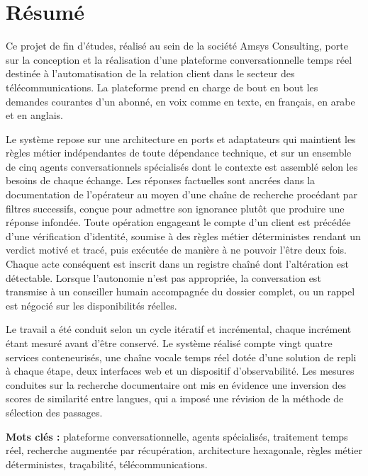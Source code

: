 \chapter*{Résumé}
\thispagestyle{empty}

Ce projet de fin d'études, réalisé au sein de la société Amsys Consulting, porte sur la conception et la réalisation d'une plateforme conversationnelle temps réel destinée à l'automatisation de la relation client dans le secteur des télécommunications. La plateforme prend en charge de bout en bout les demandes courantes d'un abonné, en voix comme en texte, en français, en arabe et en anglais.

Le système repose sur une architecture en ports et adaptateurs qui maintient les règles métier indépendantes de toute dépendance technique, et sur un ensemble de cinq agents conversationnels spécialisés dont le contexte est assemblé selon les besoins de chaque échange. Les réponses factuelles sont ancrées dans la documentation de l'opérateur au moyen d'une chaîne de recherche procédant par filtres successifs, conçue pour admettre son ignorance plutôt que produire une réponse infondée. Toute opération engageant le compte d'un client est précédée d'une vérification d'identité, soumise à des règles métier déterministes rendant un verdict motivé et tracé, puis exécutée de manière à ne pouvoir l'être deux fois. Chaque acte conséquent est inscrit dans un registre chaîné dont l'altération est détectable. Lorsque l'autonomie n'est pas appropriée, la conversation est transmise à un conseiller humain accompagnée du dossier complet, ou un rappel est négocié sur les disponibilités réelles.

Le travail a été conduit selon un cycle itératif et incrémental, chaque incrément étant mesuré avant d'être conservé. Le système réalisé compte vingt quatre services conteneurisés, une chaîne vocale temps réel dotée d'une solution de repli à chaque étape, deux interfaces web et un dispositif d'observabilité. Les mesures conduites sur la recherche documentaire ont mis en évidence une inversion des scores de similarité entre langues, qui a imposé une révision de la méthode de sélection des passages.

\bigskip
\noindent\textbf{Mots clés :} plateforme conversationnelle, agents spécialisés, traitement temps réel, recherche augmentée par récupération, architecture hexagonale, règles métier déterministes, traçabilité, télécommunications.

